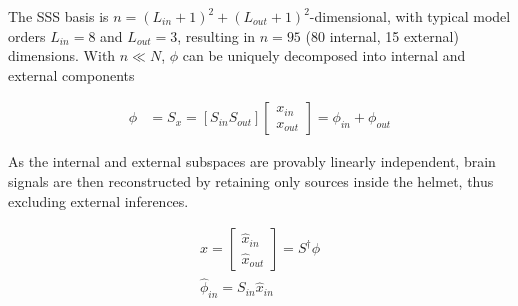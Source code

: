 The SSS basis is $n=(L_{in}+1)^2+(L_{out}+1)^2$-dimensional, with typical model orders $L_{in}=8$ and $L_{out}=3$, resulting in $n=95$ (80 internal, 15 external) dimensions.
With $n \ll N$, $\phi$ can be uniquely decomposed into internal and external components

\begin{equation}
	\begin{aligned}
			\phi &= S_x = [S_{in} S_{out}] \begin{bmatrix}
			x_{in} \\
			x_{out}
		\end{bmatrix} = \phi_{in} + \phi_{out}
	\end{aligned}
	\label{eq:sss}
\end{equation}

As the internal and external subspaces are provably linearly independent, brain signals are then reconstructed by retaining only sources inside the helmet, thus excluding external inferences.


\begin{equation}
	\begin{aligned}
    \hat{x} =
\begin{bmatrix}
	\hat{x}_{in} \\
	\hat{x}_{out}
\end{bmatrix}
= S^{\dagger}\phi \\
\hat{\phi}_{in} = S_{in}\hat{x}_{in}\\
	\end{aligned}
	\label{eq:sss}
\end{equation}


